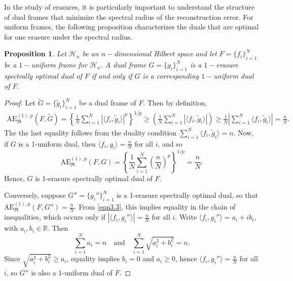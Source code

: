 \documentclass[final,1p,times]{elsarticle}
\newtheorem{prop}[thm]{Proposition}
\begin{document}
   



In the study of erasures, it is particularly important to understand the structure of dual frames that minimize the spectral radius of the reconstruction error. For uniform frames, the following proposition characterizes the duals that are optimal for one erasure under the spectral radius.


\begin{prop}\label{prop3point2}
Let \( \mathcal{H}_n \) be an \( n-\)dimensional Hilbert space and let \( F = \{f_i\}_{i=1}^N \) be a \( 1-\)uniform frame for \( \mathcal{H}_n \). A dual frame \( G = \{g_i\}_{i=1}^N \) is a \( 1-\)erasure spectrally optimal dual of \( F \) if and only if \( G \) is a corresponding \( 1-\)uniform dual of $F.$
\end{prop}



\begin{proof}
Let \( \tilde{G} = \{\tilde{g}_i\}_{i=1}^N \) be a dual frame of \( F \). Then by definition,
\begin{align}\label{eqn3.3}
\mathrm{AE}_{\mathfrak{R}}^{(1),p}(F, \tilde{G}) = \left\{ \frac{1}{N} \sum_{i=1}^N \left| \langle f_i, \tilde{g}_i \rangle \right|^p \right\}^{1/p} \geq \left( \frac{1}{N} \sum_{i=1}^N \left| \langle f_i, \tilde{g}_i \rangle \right| \right) \geq \frac{1}{N} \left| \sum_{i=1}^N \langle f_i, \tilde{g}_i \rangle \right| = \frac{n}{N}.
\end{align}
The the last equality follows from the duality condition \( \sum_{i=1}^N \langle f_i, \tilde{g}_i \rangle = n \). Now, if \( G \) is a 1-uniform dual, then \( \langle f_i, g_i \rangle = \frac{n}{N} \) for all \( i \), and so
\[
\mathrm{AE}_{\mathfrak{R}}^{(1),p}(F, G) 
= \left\{ \frac{1}{N} \sum_{i=1}^N \left( \frac{n}{N} \right)^p \right\}^{1/p} 
= \frac{n}{N}.
\]
Hence, \( G \) is 1-erasure spectrally optimal dual of $F$.

Conversely, suppose \( G'' = \{g_i''\}_{i=1}^N \) is a 1-erasure spectrally optimal dual, so that
\(
\mathrm{AE}_{\mathfrak{R}}^{(1),p}(F, G'') = \frac{n}{N}.
\)
From \eqref{eqn3.3}, this implies equality in the chain of inequalities, which occurs only if \( \left| \langle f_i, g_i'' \rangle \right| = \frac{n}{N} \) for all \( i \). Write \( \langle f_i, g_i'' \rangle = a_i + ib_i \), with \( a_i, b_i \in \mathbb{R} \). Then
\[
\sum_{i=1}^N a_i = n \quad \text{and} \quad \sum_{i=1}^N \sqrt{a_i^2 + b_i^2} = n.
\]
Since \( \sqrt{a_i^2 + b_i^2} \geq a_i \), equality implies \( b_i = 0 \) and \( a_i \geq 0 \), hence \( \langle f_i, g_i'' \rangle = \frac{n}{N} \) for all \( i \), so \( G'' \) is also a 1-uniform dual of \( F \).
\end{proof}
\end{document}
